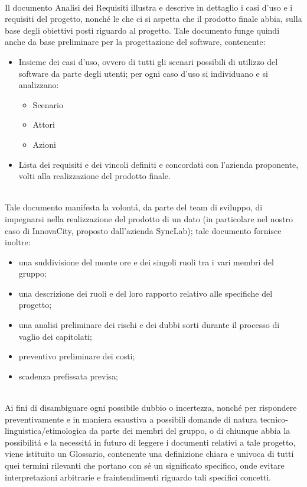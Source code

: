 \\
Il documento Analisi dei Requisiti illustra e descrive in dettaglio i casi d'uso e i requisiti del progetto, nonché le  che ci si aspetta che il prodotto finale abbia, sulla base degli obiettivi posti riguardo al progetto. Tale documento funge quindi anche da base preliminare per la progettazione del software, contenente:
\begin{itemize}
    \item Insieme dei casi d'uso, ovvero di tutti gli scenari possibili di utilizzo del software da parte degli utenti; per ogni caso d'uso si individuano e si analizzano: 
    \begin{itemize}
        \item Scenario
        \item Attori
        \item Azioni
    \end{itemize} 
    \item Lista dei requisiti e dei vincoli definiti e concordati con l'azienda proponente, volti alla realizzazione del prodotto finale.
\end{itemize}

\\
Tale documento manifesta la volontá, da parte del team di sviluppo, di impegnarsi nella realizzazione del prodotto di un dato  (in particolare nel nostro caso di InnovaCity, proposto dall'azienda SyncLab); tale documento fornisce inoltre:
\begin{itemize}
    \item una suddivisione del monte ore e dei singoli ruoli tra i vari membri del gruppo;
    \item una descrizione dei ruoli e del loro rapporto relativo alle specifiche del progetto;
    \item una analisi preliminare dei rischi e dei dubbi sorti durante il processo di vaglio dei capitolati;
    \item preventivo preliminare dei costi;
    \item scadenza prefissata previsa;
\end{itemize}

\\
Ai fini di disambiguare ogni possibile dubbio o incertezza, nonché per rispondere preventivamente e in maniera esaustiva a possibili domande di natura tecnico-linguistica/etimologica da parte dei membri del gruppo, o di chiunque abbia la possibilitá e la necessitá in futuro di leggere i documenti relativi a tale progetto, viene istituito un Glossario, contenente una definizione chiara e univoca di tutti quei termini rilevanti che portano con sé un significato specifico, onde evitare interpretazioni arbitrarie e fraintendimenti riguardo tali specifici concetti.

